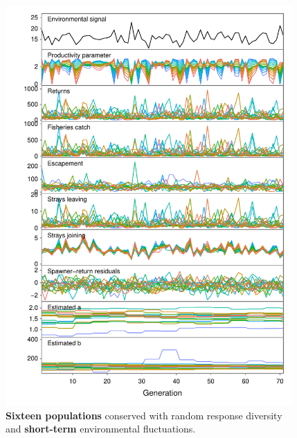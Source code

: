 \begin{figure}[htbp]
\centering
\includegraphics[width=4.3in]{metafolio/n-arma-sim-16}
\caption{\textbf{Sixteen populations} conserved with random response diversity
and \textbf{short-term} environmental fluctuations.}
\label{f:eg-n-arma-sixteen}
\end{figure}

\clearpage

